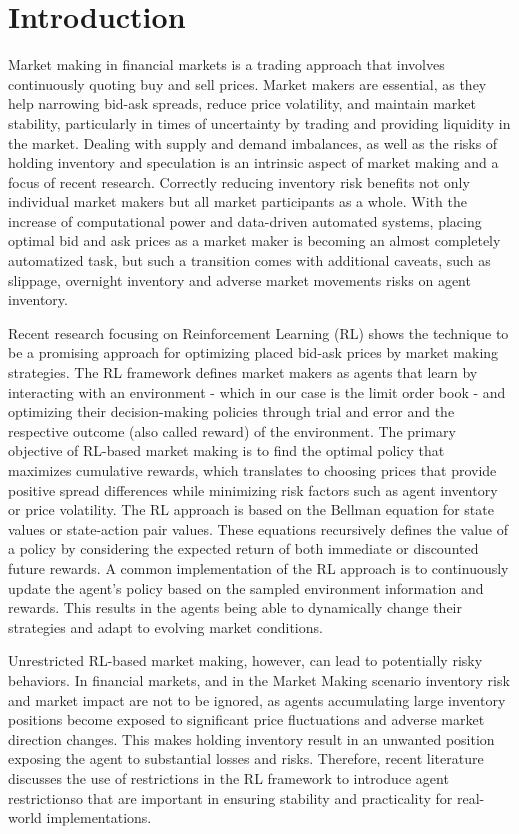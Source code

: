 \documentclass{article}
\begin{document}

\section{Introduction}

Market making in financial markets is a trading approach that involves continuously quoting buy and sell prices. Market makers are essential, as they help narrowing bid-ask spreads, reduce price volatility, and maintain market stability, particularly in times of uncertainty by trading and providing liquidity in the market. Dealing with supply and demand imbalances, as well as the risks of holding inventory and speculation is an intrinsic aspect of market making and a focus of recent research. Correctly reducing inventory risk benefits not only individual market makers but all market participants as a whole. With the increase of computational power and data-driven automated systems, placing optimal bid and ask prices as a market maker is becoming an almost completely automatized task, but such a transition comes with additional caveats, such as slippage, overnight inventory and adverse market movements risks on agent inventory. 

Recent research focusing on Reinforcement Learning (RL) shows the technique to be a promising approach for optimizing placed bid-ask prices by market making strategies. The RL framework defines market makers as agents that learn by interacting with an environment - which in our case is the limit order book - and optimizing their decision-making policies through trial and error and the respective outcome (also called reward) of the environment. The primary objective of RL-based market making is to find the optimal policy that maximizes cumulative rewards, which translates to choosing prices that provide positive spread differences while minimizing risk factors such as agent inventory or price volatility. The RL approach is based on the Bellman equation for state values or state-action pair values. These equations recursively defines the value of a policy by considering the expected return of both immediate or discounted future rewards. A common implementation of the RL approach is to continuously update the agent's policy based on the sampled environment information and rewards. This results in the agents being able to dynamically change their strategies and adapt to evolving market conditions. 

Unrestricted RL-based market making, however, can lead to potentially risky behaviors. In financial markets, and in the Market Making scenario inventory risk and market impact are not to be ignored, as agents accumulating large inventory positions become exposed to significant price fluctuations and adverse market direction changes. This makes holding inventory result in an unwanted position exposing the agent to substantial losses and risks. Therefore, recent literature discusses the use of restrictions in the RL framework to introduce agent restrictionso that are important in ensuring stability and practicality for real-world implementations. 
\end{document}
